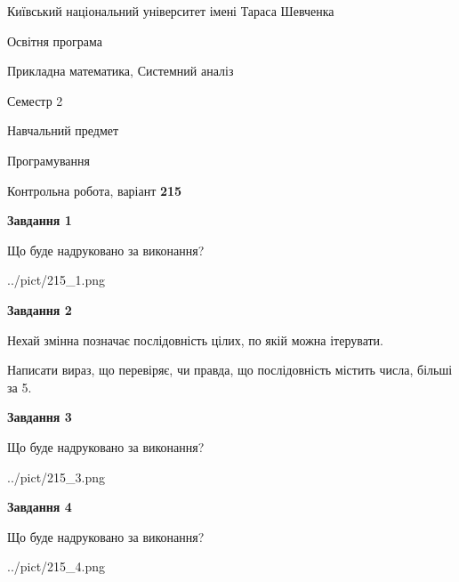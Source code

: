 \documentclass[12pt, ukrainian]{article}
\begin{document}
{{\begin {small}\par
{ \center  Київський національний університет імені Тараса Шевченка \par}
{\parbox {5 cm}{Освітня програма \hfill}{\parbox {8 cm}{Прикладна математика, Системний аналіз \hfill}}\parbox {5 cm}{\hfill Семестр 2}}\par
{\parbox {5 cm} {Навчальний предмет \hfill}\parbox {7 cm}{Програмування \hfill}\parbox {6cm}{\hfill}\par}\vspace{-7pt} \end{small}}{\center Контрольна робота, варіант  \No \textbf
{ 215 }\par}}
{
\begin {large}
{\begin {center}\textbf{Завдання 1}\end {center}}\par
Що буде надруковано за виконання?\par\par
\begin{center}
	{../pict/215_1.png}
\end{center}
\newpage

{\begin {center}\textbf{Завдання 2}\end {center}}\par
Нехай змінна  позначає послідовність цілих, по якій можна ітерувати.

Написати вираз, що перевіряє, чи правда, що послідовність  містить числа, більші за 5.\par
\newpage

{\begin {center}\textbf{Завдання 3}\end {center}}\par
Що буде надруковано за виконання?
\begin{center}
	{../pict/215_3.png}
\end{center}
\newpage

{\begin {center}\textbf{Завдання 4}\end {center}}\par
Що буде надруковано за виконання?\par
\begin{center}
	{../pict/215_4.png}
\end{center}
\newpage


\end{large}}
\end{document}
